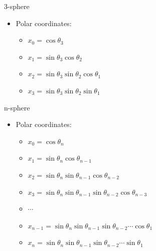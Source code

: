 \documentclass[10pt,ignorenonframetext,serif,onlymath]{beamer}
\begin{document}
\begin{frame}{3-sphere}
\protect\hypertarget{sphere}{}

\begin{itemize}
\item
  Polar coordinates:

  \begin{itemize}
  \item
    \(x_0 = \cos\theta_3\)
  \item
    \(x_1 = \sin\theta_3 \cos\theta_2\)
  \item
    \(x_2 = \sin\theta_3 \sin\theta_2 \cos\theta_1\)
  \item
    \(x_3 = \sin\theta_3 \sin\theta_2 \sin\theta_1\)
  \end{itemize}
\end{itemize}

\end{frame}

\begin{frame}{n-sphere}
\protect\hypertarget{n-sphere}{}

\begin{itemize}
\item
  Polar coordinates:

  \begin{itemize}
  \item
    \(x_0 = \cos\theta_n\)
  \item
    \(x_1 = \sin\theta_n \cos\theta_{n-1}\)
  \item
    \(x_2 = \sin\theta_n \sin\theta_{n-1} \cos\theta_{n-2}\)
  \item
    \(x_3 = \sin\theta_n \sin\theta_{n-1} \sin\theta_{n-2} \cos\theta_{n-3}\)
  \item
    \(\cdots\)
  \item
    \(x_{n-1} = \sin\theta_n \sin\theta_{n-1} \sin\theta_{n-2} \cdots \cos\theta_1\)
  \item
    \(x_n = \sin\theta_n \sin\theta_{n-1} \sin\theta_{n-2} \cdots \sin\theta_1\)
  \end{itemize}
\end{itemize}

\end{frame}
\end{document}
